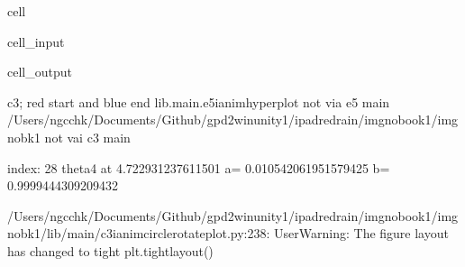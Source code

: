 \documentclass[letterpaper,10pt,english]{jupyterBook}
\begin{document}
\begin{sphinxuseclass}{cell}\begin{sphinxVerbatimInput}

\begin{sphinxuseclass}{cell_input}
\begin{sphinxVerbatim}[commandchars=\\\{\}]
 
 
   
\end{sphinxVerbatim}

\end{sphinxuseclass}\end{sphinxVerbatimInput}
\begin{sphinxVerbatimOutput}

\begin{sphinxuseclass}{cell_output}
\begin{sphinxVerbatim}[commandchars=\\\{\}]
c3; red start and blue end
lib.main.e5\PYGZus{}i\PYGZus{}anim\PYGZus{}hyperplot
not via e5 main
/Users/ngcchk/Documents/Github/gpd2\PYGZhy{}win\PYGZhy{}unity1/ipadred\PYGZhy{}rain/imgno\PYGZus{}book1/imgnobk1
not vai c3 main

index: 28 
theta4 at  4.722931237611501 
 a= 0.010542061951579425  b= \PYGZhy{}0.9999444309209432 
\end{sphinxVerbatim}

\begin{sphinxVerbatim}[commandchars=\\\{\}]
/Users/ngcchk/Documents/Github/gpd2\PYGZhy{}win\PYGZhy{}unity1/ipadred\PYGZhy{}rain/imgno\PYGZus{}book1/imgnobk1/lib/main/c3\PYGZus{}i\PYGZus{}anim\PYGZus{}circle\PYGZus{}rotate\PYGZus{}plot.py:238: UserWarning: The figure layout has changed to tight
  plt.tight\PYGZus{}layout()
\end{sphinxVerbatim}

\noindent{}

\end{sphinxuseclass}\end{sphinxVerbatimOutput}

\end{sphinxuseclass}
\end{document}
